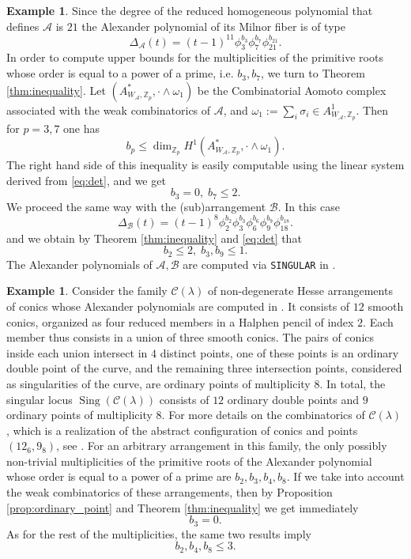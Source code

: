 \documentclass[11pt]{amsart}
\DeclareMathOperator{\Sing}{Sing}
\def\cC{\mathcal{C}}
\def\ZZ{\mathbb{Z}}
\def\w{\omega}
\theoremstyle{plain}
\theoremstyle{definition}
\newtheorem{example}[thm]{Example}
\begin{document}
\begin{example}
 Since the degree of the reduced homogeneous polynomial that defines $\mathcal{A}$ is $21$ the Alexander polynomial of its Milnor fiber is of type
$$
 \Delta_{\mathcal{A}}(t) = (t-1)^{11}\phi_3^{b_3}\phi_7^{b_7}\phi_{21}^{b_{21}}.
 $$
 In order to compute upper bounds for the multiplicities of the primitive roots whose  order is equal to a power of a prime, i.e. $b_3, b_7$, we turn to Theorem \ref{thm:inequality}. 
Let $(A^*_{W_{\mathcal{A}},\ZZ_p},\cdot\wedge\w_1)$ be the Combinatorial Aomoto complex associated with the weak combinatorics of $\mathcal{A}$, and $\w_1:=\sum_i \sigma_i\in A^1_{W_{\mathcal{A}},\ZZ_p}$. Then for $p=3,7$ one has 
$$b_p \leq \dim_{\mathbb{Z}_p} H^1(A^*_{W_{\mathcal{A}},\mathbb{Z}_p},\cdot\wedge\w_1).$$
The right hand side of this inequality is easily computable using the linear system derived from \eqref{eq:det}, and we get 
$$b_3 = 0, \; b_7 \leq 2.$$
We proceed the same way with the (sub)arrangement $\mathcal{B}$. In this case $$
 \Delta_{\mathcal{B}}(t) = (t-1)^{8}\phi_2^{b_2}\phi_3^{b_3}\phi_{6}^{b_{6}}\phi_9^{b_9}\phi_{18}^{b_{18}}.
 $$
 and we obtain by Theorem \ref{thm:inequality} and \eqref{eq:det} that 
 $$b_2 \leq 2, \; b_3, b_9 \leq 1.$$
 The Alexander polynomials of $\mathcal{A}, \mathcal{B}$ are computed via \verb}SINGULAR} in \cite[Theorem 6.4]{DPS}.\\
\end{example}
\begin{example}
\label{ex:Thm_5.4_DPS}
Consider the family $\cC(\lambda)$ of non-degenerate Hesse arrangements of conics whose Alexander polynomials are computed in \cite[Theorem 5.4]{DPS}. It consists of $12$ smooth conics, organized as four reduced members in a Halphen pencil of index $2$. Each member thus consists in a union of three smooth conics. The pairs of conics inside each union intersect in $4$ distinct points, one of these points is an ordinary double point of the curve, and the remaining three intersection points, considered as singularities of the curve, are ordinary points of multiplicity $8$. In total, the singular locus $\Sing(\cC(\lambda))$ consists of $12$ ordinary double points and $9$ ordinary points of multiplicity $8$.
For more details on the combinatorics of $\cC(\lambda)$, which is a realization of the abstract configuration of conics and points $(12_6, 9_8)$,  see \cite{DLPU}. For an arbitrary arrangement in this family, the only possibly non-trivial multiplicities of the primitive roots of the Alexander polynomial whose order is equal to a power of a prime are $b_2, b_3, b_4, b_8$.
If we take into account the weak combinatorics of these arrangements, then by Proposition \ref{prop:ordinary_point} and Theorem \ref{thm:inequality} we get immediately 
$$b_3=0.$$ As for the rest of the multiplicities, the same two results imply $$b_2, b_4, b_8 \leq 3.$$
\end{example}
\end{document}
